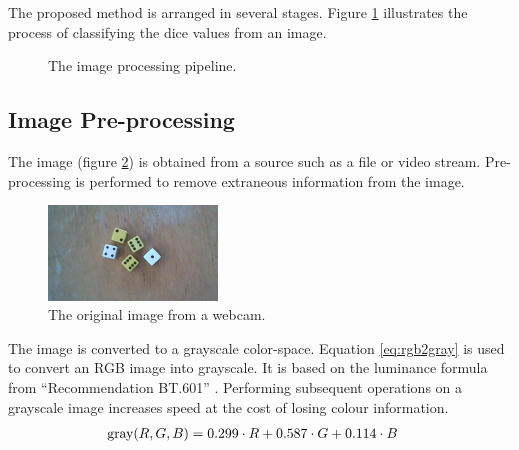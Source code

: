 \documentclass[conference]{IEEEtran}
\begin{document}
The proposed method is arranged in several stages.
Figure \ref{fig:stages} illustrates the process of classifying the dice values from an image. 
\begin{figure}
	\centering
	\caption{The image processing pipeline.}
	\label{fig:stages}
\end{figure}

\subsection{Image Pre-processing}

The image (figure \ref{fig:original}) is obtained from a source such as a file or video stream.
Pre-processing is performed to remove extraneous information from the image.
\begin{figure}
	\centering
	\includegraphics[width=0.4\textwidth]{original}
	\caption{The original image from a webcam.}
	\label{fig:original}
\end{figure}

The image is converted to a grayscale color-space.
Equation \ref{eq:rgb2gray} is used to convert an RGB image into grayscale.
It is based on the luminance formula from ``Recommendation BT.601'' \cite{R2011}.
Performing subsequent operations on a grayscale image increases speed at the cost of losing colour information.
\begin{align}
	\textnormal{gray}(R, G, B) &= 0.299 \cdot R + 0.587 \cdot G + 0.114 \cdot B \label{eq:rgb2gray}
\end{align}
\end{document}
